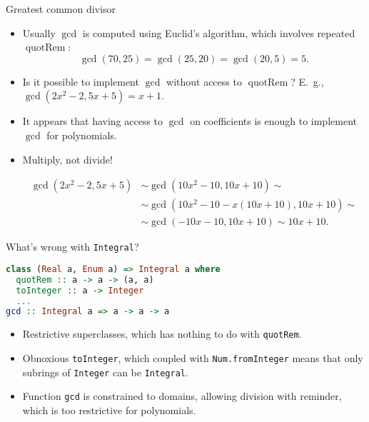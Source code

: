 \documentclass[handout]{beamer}
\DeclareMathOperator{\quotRem}{quotRem}
\begin{document}
\begin{frame}[fragile]{Greatest common divisor}

\begin{itemize}[<+->]
\item Usually $\gcd$ is computed using Euclid's algorithm,
      which involves repeated $\quotRem$:
      $$ \gcd(70, 25) = \gcd(25, 20) = \gcd(20, 5) = 5. $$
\item Is it possible to implement $\gcd$ without access to
      $\quotRem$? E.~g., $\gcd(2x^2-2, 5x+5) = x+1$.
\item It appears that having access to $\gcd$ on coefficients
      is enough to implement $\gcd$ for polynomials.
\item Multiply, not divide!

\begin{align*}
\gcd(2x^2-2, 5x+5) & \sim \gcd(10x^2-10, 10x+10) \sim \\
& \sim \gcd(10x^2-10 - x(10x+10), 10x+10) \sim \\
& \sim \gcd(-10x - 10, 10x+10)
\sim 10x+10.
\end{align*}

\end{itemize}

\end{frame}

\begin{frame}[fragile]{What's wrong with {\tt Integral}?}

\begin{lstlisting}[language=Haskell]
class (Real a, Enum a) => Integral a where
  quotRem :: a -> a -> (a, a)
  toInteger :: a -> Integer
  ...
gcd :: Integral a => a -> a -> a
\end{lstlisting}

\pause

\begin{itemize}[<+->]
\item Restrictive superclasses,
      which has nothing to do with {\tt quotRem}.
\item Obnoxious {\tt toInteger}, which coupled
      with {\tt Num.fromInteger} means
      that only subrings of {\tt Integer}
      can be {\tt Integral}.
\item Function {\tt gcd} is constrained to domains,
      allowing division with reminder, which is
      too restrictive for polynomials.
\end{itemize}

\end{frame}
\end{document}
